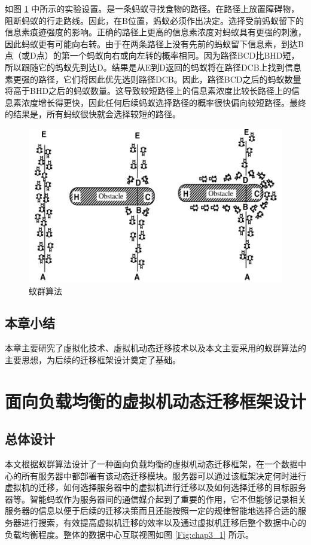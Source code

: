 如图 \ref{Fig:chap2_6} 中所示的实验设置。是一条蚂蚁寻找食物的路径。在路径上放置障碍物，阻断蚂蚁的行走路线。因此，在B位置，蚂蚁必须作出决定。选择受前蚂蚁留下的信息素痕迹强度的影响。正确的路径上更高的信息素浓度对蚂蚁具有更强的刺激，因此蚂蚁更有可能向右转。由于在两条路径上没有先前的蚂蚁留下信息素，到达B点（或D点）的第一个蚂蚁向右或向左转的概率相同。因为路径BCD比BHD短，所以跟随它的蚂蚁先到达D。结果是从E到D返回的蚂蚁将在路径DCB上找到信息素更强的路径，它们将因此优先选则路径DCB。因此，路径BCD之后的蚂蚁数量将高于BHD之后的蚂蚁数量。这导致较短路径上的信息素浓度比较长路径上的信息素浓度增长得更快，因此任何后续蚂蚁选择路径的概率很快偏向较短路径。最终的结果是，所有蚂蚁很快就会选择较短的路径。

\begin{figure}[htb]
  \centering
  \includegraphics{./Figure/IMG_Chap2_6.png}
  \caption{蚁群算法}\label{Fig:chap2_6}
\end{figure}

\section{本章小结}
本章主要研究了虚拟化技术、虚拟机动态迁移技术以及本文主要采用的蚁群算法的主要思想，为后续的迁移框架设计奠定了基础。

\chapter{面向负载均衡的虚拟机动态迁移框架设计}

\section{总体设计}
本文根据蚁群算法设计了一种面向负载均衡的虚拟机动态迁移框架，在一个数据中心的所有服务器中都部署有该动态迁移模块。服务器可以通过该框架决定何时进行虚拟机的迁移，如何选择服务器中的虚拟机进行迁移以及如何选择迁移的目标服务器等。智能蚂蚁作为服务器间的通信媒介起到了重要的作用，它不但能够记录相关服务器的信息以便于后续的迁移决策而且还能按照一定的规律智能地选择合适的服务器进行搜索，有效提高虚拟机迁移的效率以及通过虚拟机迁移后整个数据中心的负载均衡程度。整体的数据中心互联视图如图 \ref{Fig:chap3_1} 所示。

